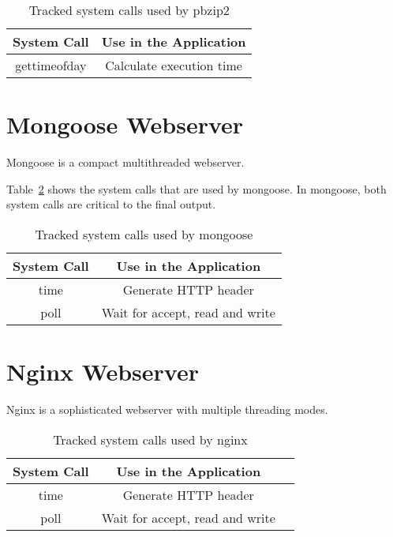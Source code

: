 \begin{table}
 \caption{Tracked system calls used by pbzip2}
\begin{center}
 \begin{tabular}{c | c}
 System Call & Use in the Application\\ \hline
 gettimeofday & Calculate execution time
 \end{tabular}
\end{center}
\label{t:pbzip2_syscall}
\end{table}

\section{Mongoose Webserver}

Mongoose is a compact multithreaded webserver.

Table~\ref{t:mongoose_syscall} shows the system calls that are used by mongoose. In mongoose, both system calls are critical to the final output.

\begin{table}
\caption{Tracked system calls used by mongoose}
\begin{center}
 \begin{tabular}{c | c}
System Call & Use in the Application\\ \hline
 time & Generate HTTP header  \\ \hline
 poll & Wait for accept, read and write
 \end{tabular}
\end{center}
\label{t:mongoose_syscall}
\end{table}

\section{Nginx Webserver}
Nginx is a sophisticated webserver with multiple threading modes.

\begin{table}
\caption{Tracked system calls used by nginx}
\begin{center}
 \begin{tabular}{c | c | c}
System Call & Use in the Application\\ \hline
 time & Generate HTTP header\\ \hline
 poll & Wait for accept, read and write
 \end{tabular}
\end{center}
\label{t:nginx_syscall}
\end{table}


